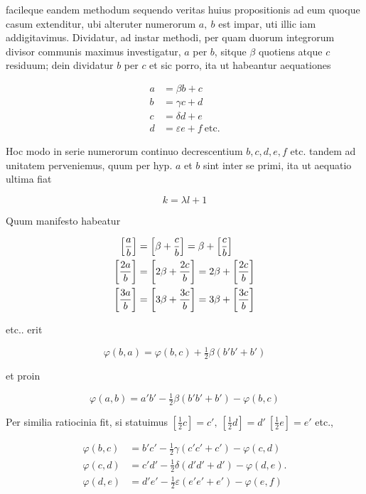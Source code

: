 facileque eandem methodum sequendo veritas huius propositionis ad eum quoque casum extenditur, ubi alteruter numerorum $a,\ b$ est impar, uti illic iam addigitavimus. Dividatur, ad instar methodi, per quam duorum integrorum divisor communis maximus investigatur, $a$ per $b$, sitque $\beta$ quotiens atque $c$ residuum; dein dividatur $b$ per $c$ et sic porro, ita ut habeantur aequationes

%
\[
\begin{aligned}
a&=\beta b+c\\
b&=\gamma c+d\\
c&=\delta d+e\\
d&=\varepsilon e+f\ \text{etc.}
\end{aligned}
\]

Hoc modo in serie numerorum continuo decrescentium $b,c,d,e,f$ etc. tandem ad unitatem perveniemus, quum per hyp. $a$ et $b$ sint inter se primi, ita ut aequatio ultima fiat

\[
k=\lambda l+1
\]

Quum manifesto habeatur

\[
\begin{aligned}
\left[\frac ab\right]&=\left[\beta+\frac cb\right]=\beta+\left[\frac cb\right]\\
\left[\frac{2a}b\right]&=\left[2\beta+\frac{2c}b\right]=2\beta+\left[\frac{2c}b\right]\\
\left[\frac{3a}b\right]&=\left[3\beta+\frac{3c}b\right]=3\beta+\left[\frac{3c}b\right]
\end{aligned}
\]

etc.. erit

\[
\varphi(b,a)=\varphi(b,c)+\tfrac12\beta(b'b'+b')
\]

et proin

\[
\varphi(a,b)=a'b'-\tfrac12\beta(b'b'+b')-\varphi(b,c)
\]

Per similia ratiocinia fit, si statuimus $[\frac12c]=c',\ [\frac12d]=d'\ [\frac12e]=e'$ etc.,

\[
\begin{aligned}
\varphi(b,c)&=b'c'-\tfrac12\gamma(c'c'+c')-\varphi(c,d)\\
\varphi(c,d)&=c'd'-\tfrac12\delta(d'd'+d')-\varphi(d,e)\mathord{.}\\
\varphi(d,e)&=d'e'-\tfrac12\varepsilon(e'e'+e')-\varphi(e,f)
\end{aligned}
\]

